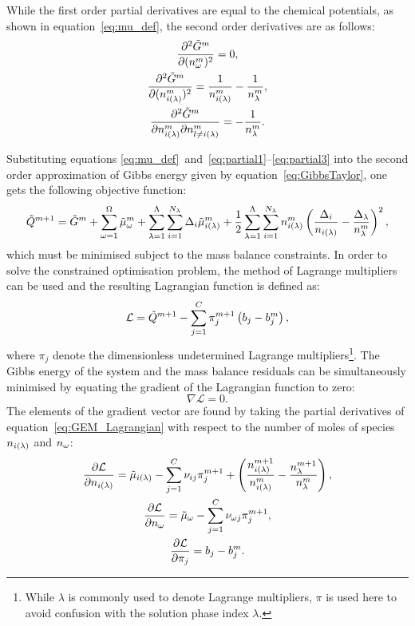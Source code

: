 While the first order partial derivatives are equal to the chemical potentials, as shown in equation~\eqref{eq:mu_def}, the second order derivatives are as follows:
\begin{gather}
  \frac{\partial^2 \tilde{G}^m}{\partial (n_\omega^m)^2} = 0, \label{eq:partial1}\\
  \frac{\partial^2 \tilde{G}^m}{\partial (n_{i(\lambda)}^m)^2} = \frac{1}{n_{i(\lambda)}^m} - \frac{1}{n_\lambda^m}, \label{eq:partial2} \\
  \frac{\partial^2 \tilde{G}^m}{\partial n_{i(\lambda)}^m \partial n_{l \neq i(\lambda)}^m} = - \frac{1}{n_\lambda^m}. \label{eq:partial3}
\end{gather}

Substituting equations \eqref{eq:mu_def}~and~\eqref{eq:partial1}--\eqref{eq:partial3} into the second order approximation of Gibbs energy given by equation~\eqref{eq:GibbsTaylor}, one gets the following objective function:
\begin{equation}
  \tilde{Q}^{m+1} = \tilde{G}^{m} + \sum_{\omega=1}^{\Omega} \tilde{\mu}_{\omega}^m
                  + \sum_{\lambda=1}^{\Lambda} \sum_{i = 1}^{N_{\lambda}} \Delta_i \tilde{\mu}_{i(\lambda)}^m
                  + \frac{1}{2} \sum_{\lambda=1}^{\Lambda} \sum_{i = 1}^{N_{\lambda}} n_{i(\lambda)}^m \left(\frac{\Delta_i}{n_{i(\lambda)}} - \frac{\Delta_\lambda}{n_\lambda^m} \right)^2,
\end{equation}
which must be minimised subject to the mass balance constraints. In order to solve the constrained optimisation problem, the method of Lagrange multipliers can be used and the resulting Lagrangian function is defined as:
  \begin{equation}\label{eq:GEM_Lagrangian}
      \mathcal{L} = \tilde{Q}^{m+1} - \sum_{j = 1}^{C} \pi_{j}^{m+1} \left(b_{j} - b_{j}^m\right),
  \end{equation}
where $\pi_{j}$ denote the dimensionless undetermined Lagrange multipliers\footnote{While $\lambda$ is commonly used to denote Lagrange multipliers, $\pi$ is used here to avoid confusion with the solution phase index $\lambda$.}. The Gibbs energy of the system and the mass balance residuals can be simultaneously minimised by equating the gradient of the Lagrangian function to zero:
\begin{equation}
  \nabla \mathcal{L} = 0.
\end{equation}
The elements of the gradient vector are found by taking the partial derivatives of  equation~\eqref{eq:GEM_Lagrangian} with respect to the number of moles of species $n_{i(\lambda)}$ and $n_\omega$:
\begin{gather}
  \frac{\partial \mathcal{L}}{\partial n_{i(\lambda)}} = \tilde{\mu}_{i(\lambda)} - \sum_{j = 1}^{C} \nu_{ij} \pi_j^{m+1} + \left(\frac{n_{i(\lambda)}^{m+1}}{n_{i(\lambda)}^{m}} - \frac{n_\lambda^{m+1}}{n_\lambda^{m}} \right), \label{eq:pderL1}\\
  \frac{\partial \mathcal{L}}{\partial n_\omega} = \tilde{\mu}_{\omega} - \sum_{j = 1}^{C} \nu_{\omega j} \pi_{j}^{m+1},\\
  \frac{\partial \mathcal{L}}{\partial \pi_j} = b_{j} - b_{j}^m.
\end{gather}

